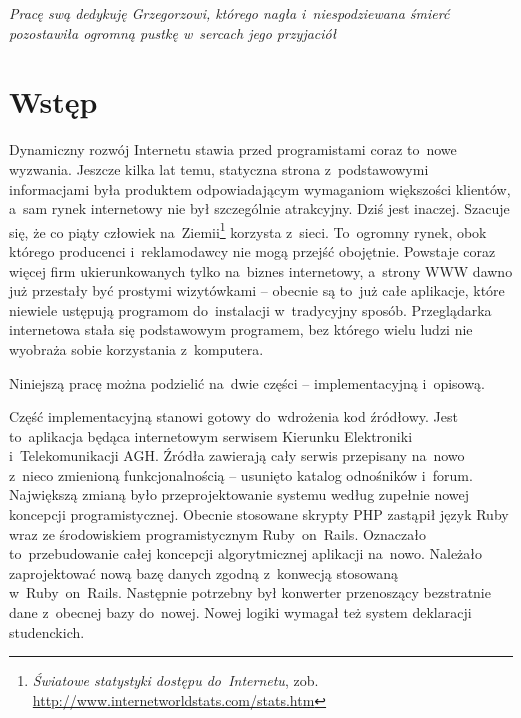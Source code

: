 \documentclass[a4paper,12pt,oneside]{report}
\begin{document}
\thispagestyle{empty}
\begin{flushright}
\vspace*{16cm}
\emph{Pracę swą dedykuję Grzegorzowi, którego nagła i~niespodziewana śmierć pozostawiła ogromną pustkę w~sercach jego przyjaciół}
\end{flushright}
\clearpage{}

\tableofcontents
\clearpage{}

\chapter*{Wstęp}
\label{cha:wstep}
Dynamiczny rozwój Internetu stawia przed programistami coraz to~nowe wyzwania. Jeszcze kilka lat temu, statyczna strona z~podstawowymi informacjami była produktem odpowiadającym wymaganiom większości klientów, a~sam rynek internetowy nie był szczególnie atrakcyjny. Dziś jest inaczej. Szacuje się, że co piąty człowiek na~Ziemii\footnote{\emph{Światowe statystyki dostępu do~Internetu}, zob. \url{http://www.internetworldstats.com/stats.htm}} korzysta z~sieci. To~ogromny rynek, obok którego producenci i~reklamodawcy nie mogą przejść obojętnie. Powstaje coraz więcej firm ukierunkowanych tylko na~biznes internetowy, a~strony WWW dawno już przestały być prostymi wizytówkami -- obecnie są to~już całe aplikacje, które niewiele ustępują programom do~instalacji w~tradycyjny sposób. Przeglądarka internetowa stała się podstawowym programem, bez którego wielu ludzi nie wyobraża sobie korzystania z~komputera.

Niniejszą pracę można podzielić na~dwie części -- implementacyjną i~opisową. 

Część implementacyjną stanowi gotowy do~wdrożenia kod źródłowy. Jest to~aplikacja będąca internetowym serwisem Kierunku Elektroniki i~Telekomunikacji AGH. Źródła zawierają cały serwis przepisany na~nowo z~nieco zmienioną funkcjonalnością -- usunięto katalog odnośników i~forum. Największą zmianą było przeprojektowanie systemu według zupełnie nowej koncepcji programistycznej. Obecnie stosowane skrypty PHP zastąpił język Ruby wraz ze środowiskiem programistycznym Ruby~on~Rails. Oznaczało to~przebudowanie całej koncepcji algorytmicznej aplikacji na~nowo. Należało zaprojektować nową bazę danych zgodną z~konwecją stosowaną w~Ruby~on~Rails. Następnie potrzebny był konwerter przenoszący bezstratnie dane z~obecnej bazy do~nowej. Nowej logiki wymagał też system deklaracji studenckich.
\end{document}
